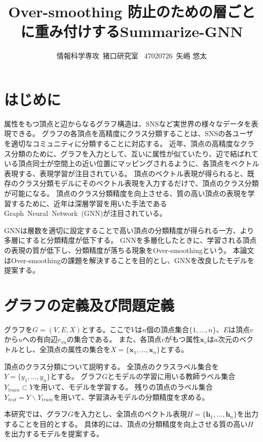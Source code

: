 \documentclass[a4j,twocolumn]{jsarticle}
\title{Over-smoothing 防止のための層ごとに重み付けするSummarize-GNN}
\author{情報科学専攻~猪口研究室~
47020726~矢嶋 悠太 }
\date{}
\begin{document}
\maketitle

\section{はじめに}
\label{sec_introduction}

属性をもつ頂点と辺からなるグラフ構造は、SNSなど実世界の様々なデータを表現できる。
グラフの各頂点を高精度にクラス分類することは、SNSの各ユーザを適切なコミュニティに分類することに対応する。
近年、頂点の高精度なクラス分類のために、グラフを入力として、互いに属性が似ていたり、辺で結ばれている頂点同士が空間上の近い位置にマッピングされるように、各頂点をベクトル表現する、表現学習が注目されている。
頂点のベクトル表現が得られると、既存のクラス分類モデルにそのベクトル表現を入力するだけで、頂点のクラス分類が可能になる。
頂点のクラス分類精度を向上させる、質の高い頂点の表現を学習するために、近年は深層学習を用いた手法であるGraph~Neural~Network~(GNN)\cite{Kipf}が注目されている。

GNNは層数を適切に設定することで高い頂点の分類精度が得られる一方、より多層にすると分類精度が低下する。
GNNを多層化したときに、学習される頂点の表現の質が低下し、分類精度が落ちる現象をOver-smoothingという。
本論文はOver-smoothingの課題を解決することを目的とし、GNNを改良したモデルを提案する。


\section{グラフの定義及び問題定義}
\label{sec_definition}

\vspace{-1mm}
グラフを$G=(V,E,X)$とする。ここで$V$は$n$個の頂点集合$\{1,\ldots,n\}$、$E$は頂点$v$から$u$への有向辺$e_{vu}$の集合である。
また、各頂点$v$がもつ属性$\bm{x}_v$は$a$次元のベクトルとし、全頂点の属性の集合を$X=\{ \bm{x}_1, \ldots, \bm{x}_n \}$とする。

頂点のクラス分類について説明する。
全頂点のクラスラベル集合を$Y=\{y_1,\ldots,y_n\}$とする。
グラフ$G$とモデルの学習に用いる教師ラベル集合$Y_{train} \subset Y$を用いて、モデルを学習する。
残りの頂点のラベル集合$Y_{test}=Y \backslash Y_{train}$を用いて、学習済みモデルの分類精度を求める。

本研究では、グラフ$G$を入力とし、全頂点のベクトル表現$H=\{\bm{h}_1, \ldots ,\bm{h}_n\}$を出力することを目的とする。
具体的には、頂点の分類精度を向上させる質の高い$H$を出力するモデルを提案する。
\end{document}
